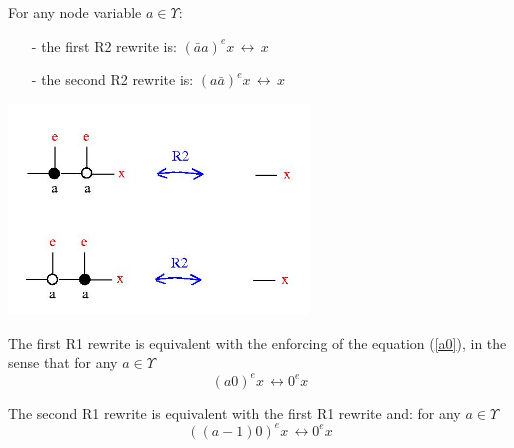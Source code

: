 \documentclass{article}
\begin{document}
\begin{definition}
For any node variable $a \in \Upsilon$: 
\begin{enumerate}
\item[-] the first R2 rewrite is: $\displaystyle \left(\bar{a} a \right)^{e} x \, \longleftrightarrow \, x$
\item[-] the second R2 rewrite is:  $\displaystyle \left(a  \bar{a}\right)^{e} x \, \longleftrightarrow \, x$
\end{enumerate}
\centerline{\includegraphics[width=80mm]{jpg/r2.jpg}}
\label{r2}
\end{definition}





\begin{proposition}
The first R1 rewrite is equivalent with the enforcing of the equation (\ref{a0}), in the sense that for any $a \in \Upsilon$ 
\begin{equation}
 (a 0)^{e} x \, \longleftrightarrow 0^{e} x 
\label{a01r1}
\end{equation}

The second R1 rewrite is equivalent with the first R1 rewrite and:  for any $a \in \Upsilon$ 
\begin{equation}
 ((a-1) 0)^{e} x \, \longleftrightarrow 0^{e} x 
\label{a02r1}
\end{equation}
\end{proposition}

 
\end{document}

